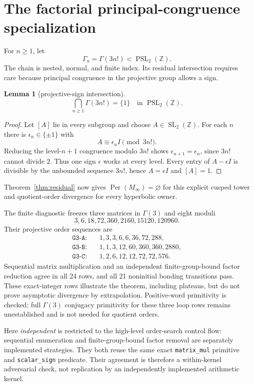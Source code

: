 \documentclass[11pt]{article}
\newtheorem{lemma}[theorem]{Lemma}
\theoremstyle{definition}
\theoremstyle{remark}
\newcommand{\ZZ}{\mathbb Z}
\newcommand{\Per}{\operatorname{Per}}
\begin{document}
\section{The factorial principal-congruence specialization}

For $n\geq1$, let
\[
\Gamma_n=\Gamma(3n!)<\operatorname{PSL}_2(\ZZ).
\]
The chain is nested, normal, and finite index. Its residual intersection requires care because principal congruence in the projective group allows a sign.

\begin{lemma}[projective-sign intersection]\label{lem:sign}
\[
\bigcap_{n\geq1}\Gamma(3n!)=\{1\}
\quad\text{in }\operatorname{PSL}_2(\ZZ).
\]
\end{lemma}

\begin{proof}
Let $[A]$ lie in every subgroup and choose $A\in\operatorname{SL}_2(\ZZ)$. For each $n$ there is $\epsilon_n\in\{\pm1\}$ with
\[
A\equiv\epsilon_nI\pmod{3n!}.
\]
Reducing the level-$n+1$ congruence modulo $3n!$ shows $\epsilon_{n+1}=\epsilon_n$, since $3n!$ cannot divide $2$. Thus one sign $\epsilon$ works at every level. Every entry of $A-\epsilon I$ is divisible by the unbounded sequence $3n!$, hence $A=\epsilon I$ and $[A]=1$.
\end{proof}

Theorem~\ref{thm:residual} now gives $\Per(M_\infty)=\varnothing$ for this explicit cusped tower and quotient-order divergence for every hyperbolic owner.

The finite diagnostic freezes three matrices in $\Gamma(3)$ and eight moduli
\[
3,6,18,72,360,2160,15120,120960.
\]
Their projective order sequences are
\begin{align*}
\texttt{G3-A}:&\quad1,3,3,6,6,36,72,288,\\
\texttt{G3-B}:&\quad1,1,3,12,60,360,360,2880,\\
\texttt{G3-C}:&\quad1,2,6,12,12,72,72,576.
\end{align*}
Sequential matrix multiplication and an independent finite-group-bound factor reduction agree in all 24 rows, and all 21 noninitial bonding transitions pass. These exact-integer rows illustrate the theorem, including plateaus, but do not prove asymptotic divergence by extrapolation. Positive-word primitivity is checked; full $\Gamma(3)$ conjugacy primitivity for these three loop rows remains unestablished and is not needed for quotient orders.

Here \emph{independent} is restricted to the high-level order-search control flow: sequential enumeration and finite-group-bound factor removal are separately implemented strategies. They both reuse the same exact \texttt{matrix\_mul} primitive and \texttt{scalar\_sign} predicate. Their agreement is therefore a within-kernel adversarial check, not replication by an independently implemented arithmetic kernel.
\end{document}
